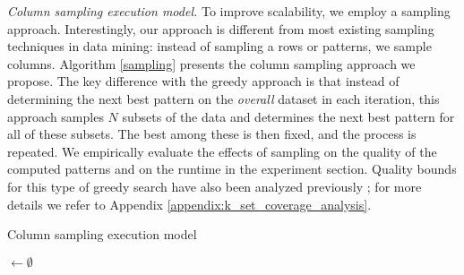 \textit{Column sampling execution model.} To improve scalability, we employ a sampling approach. Interestingly, our approach is different from most existing sampling techniques in data mining: instead of sampling a rows or patterns, we sample columns. Algorithm \ref{sampling} presents the column sampling approach we propose. The key difference with the greedy approach is that instead of determining the 
next best pattern on the {\em overall} dataset in each iteration, this approach samples $N$ subsets of the data
and determines the next best pattern for all of these subsets. The best among these is then fixed,
and the process is repeated. We empirically evaluate the effects of sampling
on the quality of the computed patterns and on the runtime in the experiment section. \changesb Quality bounds for this type of greedy search have also been analyzed previously \parencite{max_k_set_cover1}; for more details we refer to Appendix \ref{appendix:k_set_coverage_analysis}. \changese
\begin{algorithm}[thb]
  \small
 \caption{Column sampling execution model}
 \label{sampling}
 \tiles$ \gets \emptyset$\;
  \normalsize
\end{algorithm}

